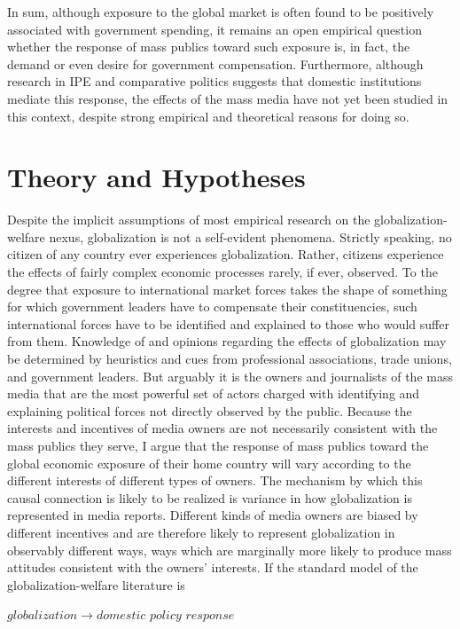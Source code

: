 \documentclass[12pt]{report}
\begin{document}
In sum, although exposure to the global market is often found to be positively associated with
government spending, it remains an open empirical question whether the response of mass publics
toward such exposure is, in fact, the demand or even desire for government compensation.
Furthermore, although research in IPE and comparative politics suggests that domestic
institutions mediate this response, the effects of the mass media have not yet been studied in
this context, despite strong empirical and theoretical reasons for doing so.

\section{Theory and Hypotheses}

Despite the implicit assumptions of most empirical research on the globalization-welfare nexus,
globalization is not a self-evident phenomena. Strictly speaking, no citizen of any country ever
experiences globalization. Rather, citizens experience the effects of fairly complex economic
processes rarely, if ever, observed. To the degree that exposure to international market forces
takes the shape of something for which government leaders have to compensate their
constituencies, such international forces have to be identified and explained to those who would
suffer from them. Knowledge of and opinions regarding the effects of globalization may be
determined by heuristics and cues from professional associations, trade unions, and government
leaders. But arguably it is the owners and journalists of the mass media that are the most
powerful set of actors charged with identifying and explaining political forces not directly
observed by the public. Because the interests and incentives of media owners are not necessarily
consistent with the mass publics they serve, I argue that the response of mass publics toward
the global economic exposure of their home country will vary according to the different
interests of different types of owners. The mechanism by which this causal connection is likely to be realized is variance in how globalization is represented in media reports. Different kinds of media owners are biased by different incentives and are therefore likely to represent globalization in observably different ways, ways which are marginally more likely to produce mass attitudes consistent with the owners' interests. If the standard model of the
globalization-welfare literature is

\begin{center}
$globalization \rightarrow domestic$ $policy$ $response$
\end{center}
\end{document}
